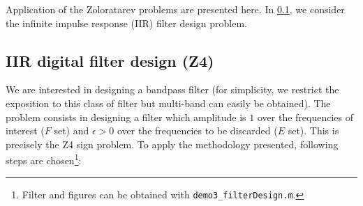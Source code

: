 Application of the Zoloratarev problems are presented here. In  \cref{ssec:filter_iir}, we consider the infinite impulse response (IIR) filter design problem. 

\subsection{IIR digital filter design (Z4)}\label{ssec:filter_iir}

We are interested in designing a bandpass filter (for simplicity, we restrict the exposition to this class of filter but multi-band can easily be obtained). The problem consists in designing a filter which amplitude is $1$ over the frequencies of interest ($F$ set) and $\epsilon>0$ over the frequencies  to be discarded ($E$ set). This is precisely the Z4 sign problem. To apply the methodology presented, following steps are chosen\footnote{Filter and figures can be obtained with \texttt{demo3\_filterDesign.m}.}:
